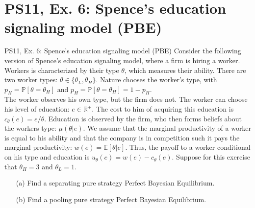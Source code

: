 \section{PS11, Ex. 6: Spence’s education signaling model (PBE)}

\begin{frame}{PS11, Ex. 6: Spence’s education signaling model (PBE)}
    Consider the following version of Spence’s education signaling model, where a firm is hiring a worker. Workers is characterized by their type $\theta$, which measures their ability. There are two worker types: $\theta\in\{\theta_L,\theta_H\}$. Nature chooses the worker’s type, with $p_H=\mathbb{P}[\theta=\theta_H]$ and $p_H=\mathbb{P}[\theta=\theta_H]=1-p_H$.\\\smallskip
    The worker observes his own type, but the firm does not. The worker can choose his level of education: $e\in\mathbb{R}^{+}$. The cost to him of acquiring this education is $c_\theta(e)=e/\theta$. Education is observed by the firm, who then forms beliefs about the workers type: $\mu(\theta|e)$. We assume that the marginal productivity of a worker is equal to his ability and that the company is in competition such it pays the marginal productivity: $w(e)=\mathbb{E}[\theta|e]$. Thus, the payoff to a worker conditional on his type and education is $u_\theta(e)=w(e)-c_\theta(e)$. Suppose for this exercise that $\theta_H=3$ and $\theta_L=1$.\vspace{-4pt}
    \begin{itemize}
      \item[(a)] Find a separating pure strategy Perfect Bayesian Equilibrium.
      \item[(b)] Find a pooling pure strategy Perfect Bayesian Equilibrium.
    \end{itemize}
    \vfill\null
\end{frame}

